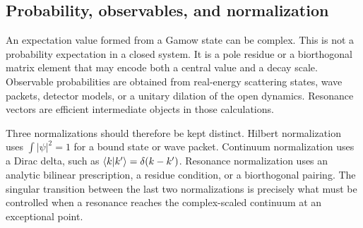 \subsection{Probability, observables, and normalization}
\label{subsec:resonance-observables}

An expectation value formed from a Gamow state can be complex.  This is not a
probability expectation in a closed system.  It is a pole residue or a
biorthogonal matrix element that may encode both a central value and a decay
scale.  Observable probabilities are obtained from real-energy scattering
states, wave packets, detector models, or a unitary dilation of the open
dynamics.  Resonance vectors are efficient intermediate objects in those
calculations.

Three normalizations should therefore be kept distinct.  Hilbert normalization
uses $\int|\psi|^2=1$ for a bound state or wave packet.  Continuum
normalization uses a Dirac delta, such as
$\langle k|k' \rangle=\delta(k-k')$.  Resonance normalization uses an analytic
bilinear prescription, a residue condition, or a biorthogonal pairing.  The
  singular transition between the last two normalizations is precisely what
  must be controlled when a resonance reaches the complex-scaled continuum at
  an exceptional point.
